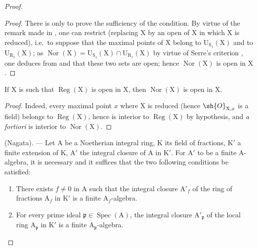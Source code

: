\begin{proof}
\begin{proof}
There is only to prove the sufficiency of the condition. By virtue of the remark made
in , one can restrict (replacing $\mathrm{X}$ by an open of $\mathrm{X}$ in which $\mathrm{X}$
is reduced), i.e.\ to suppose that the maximal points of $\mathrm{X}$ belong
to $\mathrm{U}_{\mathrm{S}_1}(\mathrm{X})$ and to $\mathrm{U}_{\mathrm{R}_1}(\mathrm{X})$; as $\operatorname{Nor}(\mathrm{X})=\mathrm{U}_{\mathrm{S}_1}(\mathrm{X})\cap\mathrm{U}_{\mathrm{R}_1}(\mathrm{X})$ by virtue of Serre's
criterion , one deduces from  and  that these two sets are
open; hence $\operatorname{Nor}(\mathrm{X})$ is open in $\mathrm{X}$.
\end{proof}

\begin{corollary}[6.13.5]
\label{IV.6.13.5}
If $\mathrm{X}$ is such that $\operatorname{Reg}(\mathrm{X})$ is open in $\mathrm{X}$, then $\operatorname{Nor}(\mathrm{X})$ is
open in $\mathrm{X}$.
\end{corollary}

\begin{proof}
Indeed, every maximal point $x$ where $\mathrm{X}$ is reduced (hence $\sh{O}_{\mathrm{X},x}$ is a field) belongs
to $\operatorname{Reg}(\mathrm{X})$, hence is interior to $\operatorname{Reg}(\mathrm{X})$ by hypothesis, and \emph{a fortiori} is interior to $\operatorname{Nor}(\mathrm{X})$.
\end{proof}

\begin{proposition}[6.13.6]
\label{IV.6.13.6}
\textnormal{(Nagata).} --- Let $\mathrm{A}$ be a Noetherian integral ring, $\mathrm{K}$ its field of
fractions, $\mathrm{K}'$ a finite extension of $\mathrm{K}$, $\mathrm{A}'$ the integral closure of $\mathrm{A}$ in $\mathrm{K}'$. For $\mathrm{A}'$
to be a finite $\mathrm{A}$-algebra, it is necessary and it suffices that the two following conditions be satisfied:
\begin{enumerate}[label=(\roman*)]
  \item There exists $f\neq 0$ in $\mathrm{A}$ such that the integral closure $\mathrm{A}'_f$ of the ring of fractions $\mathrm{A}_f$
in $\mathrm{K}'$ is a finite $\mathrm{A}_f$-algebra.
  \item For every prime ideal $\mathfrak{p}\in\operatorname{Spec}(\mathrm{A})$, the integral closure $\mathrm{A}'_\mathfrak{p}$ of the local ring $\mathrm{A}_\mathfrak{p}$
in $\mathrm{K}'$ is a finite $\mathrm{A}_\mathfrak{p}$-algebra.
\end{enumerate}
\end{proposition}


\end{proof}
